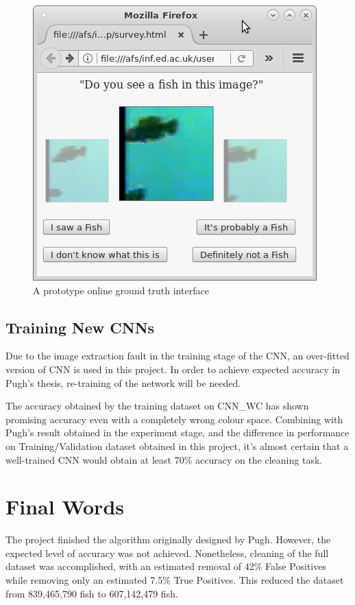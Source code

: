 \documentclass[bsc,logo,twoside,fullspacing,parskip]{infthesis}
\begin{document}
\begin{figure}[!h]
    \centering
    \includegraphics[scale=0.5]{graph/query.png}
    \caption{A prototype online ground truth interface}
    \label{fig:gto}
\end{figure}

\subsection{Training New CNNs}

Due to the image extraction fault in the training stage of the CNN, an over-fitted version of CNN is used in this project. 
In order to achieve expected accuracy in Pugh's thesis\cite{Pugh}, re-training of the network will be needed.

The accuracy obtained by the training dataset on CNN\_WC has shown promising accuracy even with a completely wrong colour space. Combining with Pugh's result obtained in the experiment stage, and the difference in performance on Training/Validation dataset obtained in this project, it's almost certain that a well-trained CNN would obtain at least 70\% accuracy on the cleaning task. 

\section{Final Words}

The project finished the algorithm originally designed by Pugh. However, the expected level of accuracy was not achieved.
Nonetheless, cleaning of the full dataset was accomplished, with an estimated removal of 42\% False Positives while removing only an estimated 7.5\% True Positives. This reduced the dataset from 839,465,790 fish to 607,142,479 fish.
\end{document}
